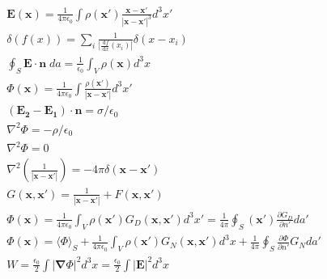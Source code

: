 \documentclass[10pt]{article}
\newcommand{\vect}[1]{\mathbf{#1}}
\newcommand{\vc}[1]{\mathbf{#1}}
\newcommand{\dd}{\, \mathrm{d}}
\newcommand{\eo}{\epsilon_0}
\newcommand{\tder}[2]{\frac{\dd #1}{\dd #2}}
\newcommand{\pder}[2]{\frac{\partial #1}{\partial #2}}
\newcommand{\K}{\frac{1}{4 \pi \eo}}
\begin{document}
\begin{align*}
& \vect{E}(\vect{x}) = \frac{1}{4 \pi \eo} \int \rho(\vect{x}') \frac{\vect{x} - \vect{x}'}{|\vect{x} - \vect{x}'|^3} d^3x' \tag*{Coulomb's Law (1.5)} \\
& \delta(f(x)) = \sum_{i} \frac{1}{\left|\tder{f}{x}(x_i)\right|}\delta(x - x_i)	\tag*{Delta function Rule 5 } \\
& \oint_S \vc{E} \cdot \vc{n} \; da = \frac{1}{\eo} \int_V \rho(\vc{x}) d^3x	\tag*{Gauss' Law (1.11)} \\
& \Phi(\vc{x}) = \K \int \frac{\rho (\vc{x}')}{|\vc{x} - \vc{x}'|} d^3 x' \tag*{Scalar potential in terms of charge density (1.17)} \\
& (\vc{E_2} - \vc{E_1}) \cdot \vc{n} = \sigma/\eo	\tag*{Electric field of a surface distribution (1.22)} \\
& \nabla^2 \Phi = -\rho/\eo	\tag*{Poisson Equation (1.28)}\\
& \nabla^2 \Phi = 0		\tag*{Laplace Equation (1.29)}\\
& \nabla^2 \left( \frac{1}{|\vc{x} - \vc{x}'|} \right) = - 4 \pi \delta(\vc{x} - \vc{x}') \tag*{Laplace's equation for a point charge (1.31)} \\
& G(\vc{x}, \vc{x}') = \frac{1}{|\vc{x} - \vc{x}'|} + F(\vc{x}, \vc{x}')	\tag*{Green's function for Poisson's equation (1.40)} \\
& \Phi(\vc{x}) = \K \int_V \rho(\vc{x}') G_D(\vc{x}, \vc{x}') d^3x' = \frac{1}{4 \pi} \oint_S(\vc{x}') \pder{G_D}{n'} da'	\tag*{Green's function potential Dirichlet B.C.s (1.44)} \\
& \Phi(\vc{x}) = \langle\Phi\rangle_S + \K \int_V \rho(\vc{x}') G_N(\vc{x},\vc{x}') d^3x + \frac{1}{4 \pi} \oint_S \pder{\Phi}{n'} G_N da'	\tag*{Green's function potential Neumann B.C.s (1.46)} \\
& W = \frac{\eo}{2} \int |\vc{\nabla} \Phi|^2 d^3x = \frac{\eo}{2} \int \left| \vc{E} \right|^2 d^3 x	\tag*{Energy stored in electric field (1.54)} \\

\end{align*}
\end{document}
